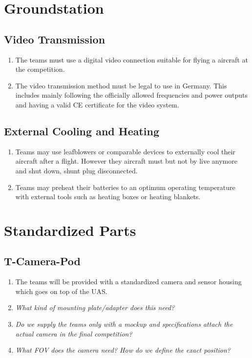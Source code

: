 \documentclass{article}
\begin{document}
\section{Groundstation}
\subsection{Video Transmission}
\begin{enumerate}
  \item The teams must use a digital video connection suitable for flying a aircraft at the competition.  
  \item The video transmission method must be legal to use in Germany. This includes mainly following the officially allowed frequencies and power outputs and having a valid CE certificate for the video system.
\end{enumerate}

\subsection{External Cooling and Heating}
\begin{enumerate}
  \item Teams may use leafblowers or comparable devices to externally cool their aircraft after a flight. However they aircraft must but not by live anymore and shut down, shunt plug disconnected.  
  \item Teams may preheat their batteries to an optimum operating temperature with external tools such as heating boxes or heating blankets.
\end{enumerate}

\section{Standardized Parts}

\subsection{T-Camera-Pod}
\begin{enumerate}
  \item The teams will be provided with a standardized camera and sensor housing which goes on top of the UAS.
  \item \emph{What kind of mounting plate/adapter does this need?}
  \item \emph{Do we supply the teams only with a mockup and specifications attach the actual camera in the final competition?}
  \item \emph{What FOV does the camera need? How do we define the exact position?}
\end{enumerate}
\end{document}
